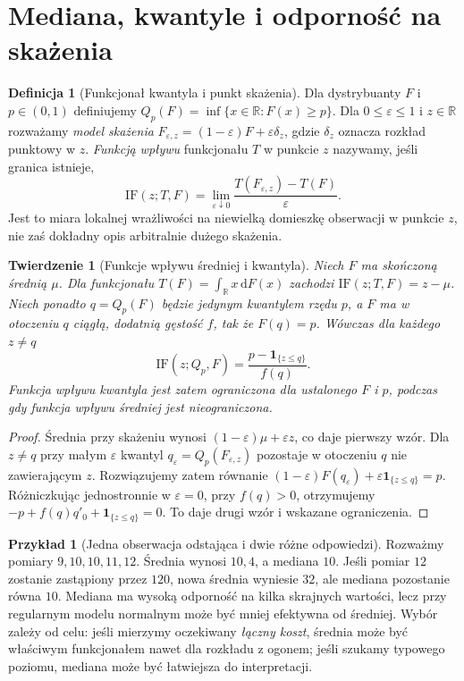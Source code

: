 \documentclass[11pt,a4paper,oneside]{report}
\numberwithin{equation}{chapter}
\theoremstyle{plain}
\newtheorem{twierdzenie}{Twierdzenie}[chapter]
\theoremstyle{definition}
\newtheorem{definicja}{Definicja}[chapter]
\newtheorem{przyklad}{Przykład}[chapter]
\theoremstyle{remark}
\newcommand{\R}{\mathbb R}
\newcommand{\ind}[1]{\mathbf 1_{#1}}
\newcommand{\dd}{\mathrm d}
\begin{document}
\section{Mediana, kwantyle i odporność na skażenia}
\begin{definicja}[Funkcjonał kwantyla i punkt skażenia]
Dla dystrybuanty $F$ i $p\in(0,1)$ definiujemy
$Q_p(F)=\inf\{x\in\R:F(x)\ge p\}$.
Dla $0\le\varepsilon\le1$ i $z\in\R$ rozważamy
\emph{model skażenia}
$F_{\varepsilon,z}=(1-\varepsilon)F+\varepsilon\delta_z$,
gdzie $\delta_z$ oznacza rozkład punktowy w $z$.
\emph{Funkcją wpływu} funkcjonału $T$ w punkcie $z$ nazywamy,
jeśli granica istnieje,
\[
 \mathrm{IF}(z;T,F)=
 \lim_{\varepsilon\downarrow0}
 \frac{T(F_{\varepsilon,z})-T(F)}{\varepsilon}.
\]
Jest to miara lokalnej wrażliwości na niewielką domieszkę
obserwacji w punkcie $z$, nie zaś dokładny opis
arbitralnie dużego skażenia.
\end{definicja}

\begin{twierdzenie}[Funkcje wpływu średniej i kwantyla]
\label{thm:influence-mean-quantile}
Niech $F$ ma skończoną średnią $\mu$.
Dla funkcjonału $T(F)=\int_\R x\,\dd F(x)$
zachodzi $\mathrm{IF}(z;T,F)=z-\mu$.
Niech ponadto $q=Q_p(F)$ będzie jedynym kwantylem
rzędu $p$, a $F$ ma w otoczeniu $q$ ciągłą,
dodatnią gęstość $f$, tak że $F(q)=p$.
Wówczas dla każdego $z\ne q$
\[
 \mathrm{IF}(z;Q_p,F)=
 \frac{p-\ind{\{z\le q\}}}{f(q)}.
\]
Funkcja wpływu kwantyla jest zatem ograniczona
dla ustalonego $F$ i $p$, podczas gdy funkcja wpływu
średniej jest nieograniczona.
\end{twierdzenie}
\begin{proof}
Średnia przy skażeniu wynosi
$(1-\varepsilon)\mu+\varepsilon z$, co daje pierwszy wzór.
Dla $z\ne q$ przy małym $\varepsilon$ kwantyl
$q_\varepsilon=Q_p(F_{\varepsilon,z})$ pozostaje
w otoczeniu $q$ nie zawierającym $z$.
Rozwiązujemy zatem równanie
$(1-\varepsilon)F(q_\varepsilon)+
\varepsilon\ind{\{z\le q\}}=p$.
Różniczkując jednostronnie w $\varepsilon=0$,
przy $f(q)>0$, otrzymujemy
$-p+f(q)q'_0+\ind{\{z\le q\}}=0$.
To daje drugi wzór i wskazane ograniczenia.
\end{proof}

\begin{przyklad}[Jedna obserwacja odstająca i dwie różne odpowiedzi]
Rozważmy pomiary $9,10,10,11,12$. Średnia wynosi $10{,}4$,
a mediana $10$. Jeśli pomiar $12$ zostanie zastąpiony
przez $120$, nowa średnia wyniesie $32$, ale mediana
pozostanie równa $10$. Mediana ma wysoką odporność
na kilka skrajnych wartości, lecz przy regularnym modelu
normalnym może być mniej efektywna od średniej.
Wybór zależy od celu: jeśli mierzymy oczekiwany
\emph{łączny koszt}, średnia może być właściwym funkcjonałem
nawet dla rozkładu z ogonem; jeśli szukamy typowego
poziomu, mediana może być łatwiejsza do interpretacji.
\end{przyklad}
\end{document}

